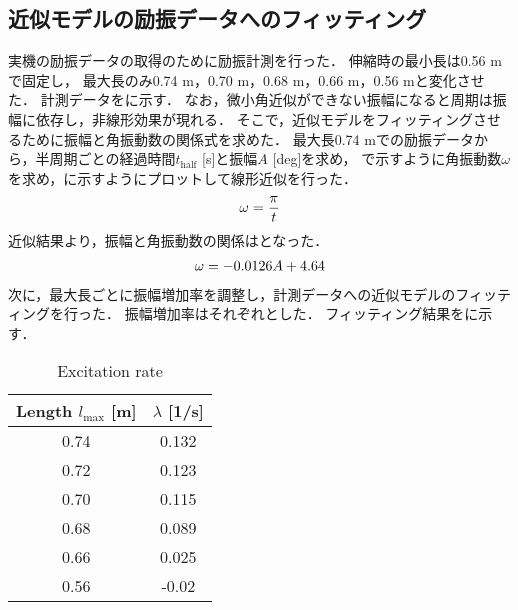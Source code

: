         \subsection{近似モデルの励振データへのフィッティング}
          
          実機の励振データの取得のために励振計測を行った．
          伸縮時の最小長は0.56 mで固定し，
          最大長のみ0.74 m，0.70 m，0.68 m，0.66 m，0.56 mと変化させた． 計測データを\figref{}に示す．    
          なお，微小角近似ができない振幅になると周期は振幅に依存し，非線形効果が現れる．
          そこで，近似モデルをフィッティングさせるために振幅と角振動数の関係式を求めた．
          最大長0.74 mでの励振データから，半周期ごとの経過時間$t_{\mathrm{half}}$ [s]と振幅$A$ [deg]を求め，
          で示すように角振動数$\omega$を求め，\figref{}に示すようにプロットして線形近似を行った．
          \begin{eqnarray}
            \equlabel{T2omega}
            \omega=\frac{\pi}{t}
          \end{eqnarray}
          近似結果より，振幅と角振動数の関係はとなった．
          \begin{eqnarray}
            \equlabel{A2ome}
            \omega=-0.0126A+4.64
          \end{eqnarray}
          次に，最大長ごとに振幅増加率を調整し，計測データへの近似モデルのフィッティングを行った．
          振幅増加率はそれぞれとした．
          フィッティング結果を\figref{}に示す．
          \begin{table}[tb]
            \begin{center}
              \caption{Excitation rate}
              \vspace{2mm}
              \begin{tabular}{c|c}
                \hline
                Length $l_{\mathrm{max}}$ [m] & $\lambda$ [1/s] \\
                \hline
                0.74 &  0.132\\
                0.72 &  0.123\\
                0.70 &  0.115\\
                0.68 &  0.089\\
                0.66 &  0.025\\
                0.56 &  -0.02\\                       
                \hline
              \end{tabular}
            \end{center}
          \end{table}
